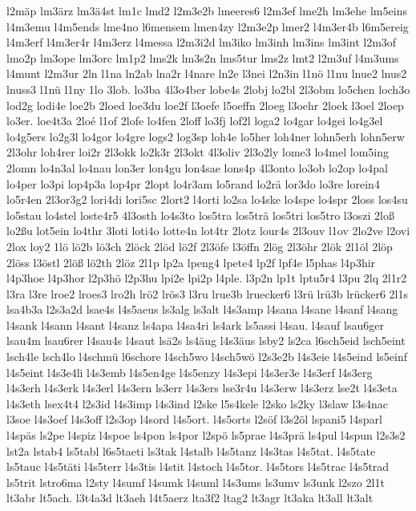 {l2mäp
lm3ärz
lm3ä4st
lm1c
lmd2
l2m3e2b
lmeeres6
l2m3ef
lme2h
lm3ehe
lm5eins
l4m3emu
l4m5ends
lme4no
l6mensem
lmen4zy
l2m3e2p
lmer2
l4m3er4b
l6m5ereig
l4m3erf
l4m3er4r
l4m3erz
l4messa
l2m3i2d
lm3iko
lm3inh
lm3ins
lm3int
l2m3of
lmo2p
lm3ope
lm3orc
lm1p2
lms2k
lm3s2n
lms5tur
lms2z
lmt2
l2m3uf
l4m3ums
l4munt
l2m3ur
2ln
l1na
ln2ab
lna2r
l4nare
ln2e
l3nei
l2n3in
l1nö
l1nu
lnue2
lnus2
lnuss3
l1nü
l1ny
1lo
3lob.
lo3ba
4l3o4ber
lobe4s
2lobj
lo2bl
2l3obm
lo5chen
loch3o
lod2g
lodi4e
loe2b
2loed
loe3du
loe2f
l3oefe
l5oeffn
2loeg
l3oehr
2loek
l3oel
2loep
lo3er.
loe4t3a
2loé
l1of
2lofe
lo4fen
2loff
lo3fj
lof2l
loga2
lo4gar
lo4gei
lo4g3el
lo4g5ers
lo2g3l
lo4gor
lo4gre
logs2
log3sp
loh4e
lo5her
loh4ner
lohn5erh
lohn5erw
2l3ohr
loh4rer
loi2r
2l3okk
lo2k3r
2l3okt
4l3oliv
2l3o2ly
lome3
lo4mel
lom5ing
2lomn
lo4n3al
lo4nau
lon3er
lon4gu
lon4sae
lons4p
4l3onto
lo3ob
lo2op
lo4pal
lo4per
lo3pi
lop4p3a
lop4pr
2lopt
lo4r3am
lo5rand
lo2rä
lor3do
lo3re
lorein4
lo5r4en
2l3or3g2
lori4di
lori5sc
2lort2
l4orti
lo2sa
lo4ske
lo4spe
lo4spr
2loss
los4su
lo5stau
lo4stel
loste4r5
4l3osth
lo4s3to
los5tra
los5trä
los5tri
los5tro
l3oszi
2loß
lo2ßu
lot5ein
lo4thr
3loti
loti4o
lotte4n
lot4tr
2lotz
lour4s
2l3ouv
l1ov
2lo2ve
l2ovi
2lox
loy2
1lö
lö2b
lö3ch
2löck
2löd
lö2f
2l3öfe
l3öffn
2lög
2l3öhr
2lök
2l1öl
2löp
2löss
l3östl
2löß
lö2th
2löz
2l1p
lp2a
lpeng4
lpete4
lp2f
lpf4e
l5phas
l4p3hir
l4p3hoe
l4p3hor
l2p3hö
l2p3hu
lpi2e
lpi2p
l4ple.
l3p2n
lp1t
lptu5r4
l3pu
2lq
2l1r2
l3ra
l3re
lroe2
lroes3
lro2h
lrö2
lrös3
l3ru
lrue3b
lruecker6
l3rü
lrü3b
lrücker6
2l1s
lsa4b3a
l2s3a2d
lsae4s
l4s5aeus
ls3alg
ls3alt
l4s3amp
l4sana
l4sane
l4sanf
l4sang
l4sank
l4sann
l4sant
l4sanz
ls4apa
l4sa4ri
ls4ark
ls5assi
l4sau.
l4sauf
lsau6ger
lsau4m
lsau6rer
l4sau4s
l4saut
lsä2s
ls4äug
l4s3äus
lsby2
ls2ca
l6sch5eid
lsch5eint
lsch4le
lsch4lo
l4schmü
l6schore
l4sch5wo
l4sch5wö
l2s3e2b
l4s3eie
l4s5eind
ls5einf
l4s5eint
l4s3e4li
l4s3emb
l4s5en4ge
l4s5enzy
l4s3epi
l4s3er3e
l4s3erf
l4s3erg
l4s3erh
l4s3erk
l4s3erl
l4s3ern
ls3err
l4s3ers
lse3r4u
l4s3erw
l4s3erz
lse2t
l4s3eta
l4s3eth
lsex4t4
l2s3id
l4s3imp
l4s3ind
l2ske
l5s4kele
l2sko
ls2ky
l3slaw
l3s4nac
l3soe
l4s3oef
l4s3off
l2s3op
l4sord
l4s5ort.
l4s5orts
l2söf
l3s2öl
lspani5
l4sparl
l4späs
ls2pe
l4spiz
l4spoe
ls4pon
ls4por
l2spö
ls5prae
l4s3prä
ls4pul
l4spun
l2s3s2
lst2a
lstab4
ls5tabl
l6s5taeti
ls3tak
l4stalb
l4s5tanz
l4s3tas
l4s5tat.
l4s5tate
ls5tauc
l4s5täti
l4s5terr
l4s3tis
l4stit
l4stoch
l4s5tor.
l4s5tors
l4s5trac
l4s5trad
ls5trit
lstro6ma
l2sty
l4sumf
l4sumk
l4suml
l4s3ums
ls3umv
ls3unk
l2szo
2l1t
lt3abr
lt5ach.
l3t4a3d
lt3aeh
l4t5aerz
lta3f2
ltag2
lt3agr
lt3aka
lt3all
lt3alt
}
